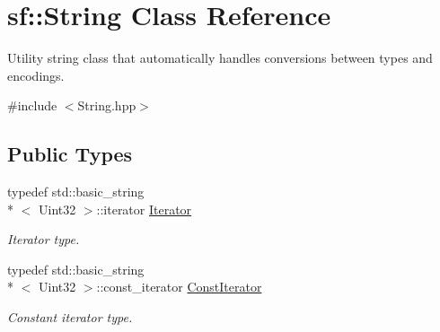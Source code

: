 \hypertarget{classsf_1_1_string}{\section{sf\+:\+:String Class Reference}
\label{classsf_1_1_string}
}


Utility string class that automatically handles conversions between types and encodings.  




{\ttfamily \#include $<$String.\+hpp$>$}

\subsection*{Public Types}
\begin{DoxyCompactItemize}
\item 
\hypertarget{classsf_1_1_string_ac90f2b7b28f703020f8d027e98806235}{typedef std\+::basic\+\_\+string\\*
$<$ Uint32 $>$\+::iterator \hyperlink{classsf_1_1_string_ac90f2b7b28f703020f8d027e98806235}{Iterator}}\label{classsf_1_1_string_ac90f2b7b28f703020f8d027e98806235}

\begin{DoxyCompactList}\small\item\em Iterator type. \end{DoxyCompactList}\item 
\hypertarget{classsf_1_1_string_a8e18efc2e8464f6eb82818902d527efa}{typedef std\+::basic\+\_\+string\\*
$<$ Uint32 $>$\+::const\+\_\+iterator \hyperlink{classsf_1_1_string_a8e18efc2e8464f6eb82818902d527efa}{Const\+Iterator}}\label{classsf_1_1_string_a8e18efc2e8464f6eb82818902d527efa}

\begin{DoxyCompactList}\small\item\em Constant iterator type. \end{DoxyCompactList}\end{DoxyCompactItemize}

